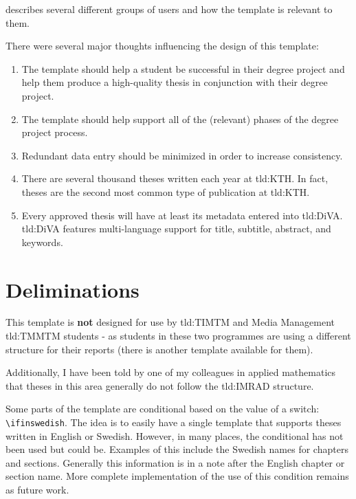  describes several different groups of users and how the template is relevant to them.

There were several major thoughts influencing the design of this template:
\begin{enumerate}[leftmargin=*, label=\textbf{Thought \arabic*}, ref={Thought \arabic*}]
    \item \label{thought:helpStudent} The template should help a student be successful in their degree project and help them produce a high-quality thesis in conjunction with their degree project.
    
    \item \label{thought:process} The template should help support all of the (relevant) phases of the degree project process.
    
    \item \label{thought:reducingDataEntry} Redundant data entry should be minimized in order to increase consistency.
    
    \item \label{thought:volume} There are several thousand theses written each year at \gls{tld:KTH}. In fact, theses are the second most common type of publication at \gls{tld:KTH}.
    
    \item \label{thought:inDiVA} Every approved thesis will have at least its metadata entered into \gls{tld:DiVA}. \gls{tld:DiVA} features multi-language support for title, subtitle, abstract, and keywords.
\end{enumerate}

\section{Deliminations}

This template is \textbf{not} designed for use by \gls{tld:TIMTM} and Media Management \gls{tld:TMMTM} students - as students in these two programmes are using a different structure for their reports (there is another template available for them).

Additionally, I have been told by one of my colleagues in applied mathematics that theses in this area generally do not follow the \gls{tld:IMRAD} structure.

Some parts of the template are conditional based on the value of a switch: \texttt{\textbackslash ifinswedish}. The idea is to easily have a single template that supports theses written in English or Swedish. However, in many places, the conditional has not been used but could be. Examples of this include the Swedish names for chapters and sections. Generally this information is in a note after the English chapter or section name. More complete implementation of the use of this condition remains as future work.

